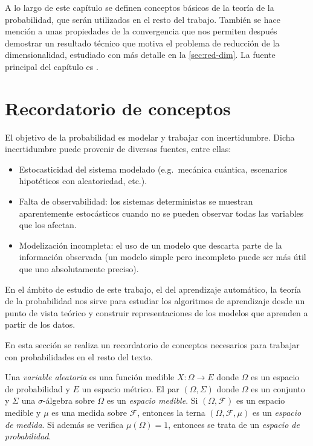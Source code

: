 A lo largo de este capítulo se definen conceptos básicos de la teoría de la probabilidad, que serán utilizados en el resto del trabajo. También se hace mención a unas propiedades de la convergencia que nos permiten después demostrar un resultado técnico que motiva el problema de reducción de la dimensionalidad, estudiado con más detalle en la \autoref{sec:red-dim}.  La fuente principal del capítulo es \textcite{jaynes2003}.

\section{Recordatorio de conceptos}\label{conceptos}

El objetivo de la probabilidad es modelar y trabajar con incertidumbre.
Dicha incertidumbre puede provenir de diversas fuentes, entre ellas:

\begin{itemize}
\tightlist
\item
  Estocasticidad del sistema modelado (e.g.~mecánica cuántica,
  escenarios hipotéticos con aleatoriedad, etc.).
\item
  Falta de observabilidad: los sistemas deterministas se muestran
  aparentemente estocásticos cuando no se pueden observar todas las
  variables que los afectan.
\item
  Modelización incompleta: el uso de un modelo que descarta parte de la
  información observada (un modelo simple pero incompleto puede ser más
  útil que uno absolutamente preciso).
\end{itemize}

En el ámbito de estudio de este trabajo, el del aprendizaje automático, la
teoría de la probabilidad nos sirve para estudiar los algoritmos de
aprendizaje desde un punto de vista teórico y construir representaciones de los
modelos que aprenden a partir de los datos.

En esta sección se realiza un recordatorio de conceptos necesarios para
trabajar con probabilidades en el resto del texto.

Una \emph{variable aleatoria} es una función medible
\(X:\Omega\rightarrow E\) donde \(\Omega\) es un espacio de probabilidad
y \(E\) un espacio métrico. 
{}
El par \((\Omega, \Sigma)\) donde \(\Omega\) es un conjunto y \(\Sigma\)
una \(\sigma\)-álgebra sobre \(\Omega\) es un \emph{espacio medible}.
{}
Si \((\Omega, \mathcal{F})\) es un espacio medible y \(\mu\) es una
medida sobre \(\mathcal{F}\), entonces la terna
\((\Omega, \mathcal{F}, \mu)\) es un \emph{espacio de medida}. Si
además se verifica \(\mu(\Omega)=1\), entonces se trata de un
\emph{espacio de probabilidad}. 

